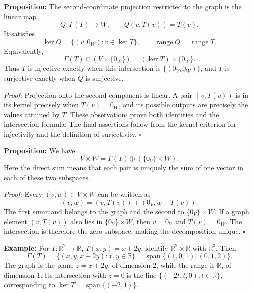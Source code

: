 \documentclass[a4paper,11pt,abstract=true]{scrartcl}
\theoremstyle{dotlessP}
\theoremstyle{dotlessS}
\theoremstyle{remark}
\theoremstyle{definition}
\begin{document}
\begin{problem_box}
\textbf{Proposition:} The
second-coordinate projection restricted to the graph is the linear map
\[
Q:\Gamma(T)\longrightarrow W,\qquad Q(v,T(v))=T(v).
\]
It satisfies
\[
\ker Q=\{(v,0_W):v\in\ker T\},\qquad
\operatorname{range}Q=\operatorname{range}T.
\]
Equivalently,
\[
\Gamma(T)\cap(V\times\{0_W\})=(\ker T)\times\{0_W\}.
\]
Thus $T$ is injective exactly when this intersection is
$\{(0_V,0_W)\}$, and $T$ is surjective exactly when $Q$ is surjective.

\end{problem_box}

\begin{claim_box}
\textit{Proof:} Projection onto the second component is linear.
A pair $(v,T(v))$ is in its kernel precisely when $T(v)=0_W$,
and its possible outputs are precisely the values attained by $T$.
These observations prove both identities and the intersection formula.
The final assertions follow from the kernel criterion for injectivity
and the definition of surjectivity. \hfill$\square$
\end{claim_box}

\begin{problem_box}
\textbf{Proposition:} We have
\[
V\times W=\Gamma(T)\oplus(\{0_V\}\times W).
\]
Here the direct sum means that each pair is uniquely the sum of one
vector in each of these two subspaces.

\end{problem_box}

\begin{claim_box}
\textit{Proof:} Every $(v,w)\in V\times W$ can be written as
\[
(v,w)=(v,T(v))+(0_V,w-T(v)).
\]
The first summand belongs to the graph and the second to
$\{0_V\}\times W$. If a graph element $(v,T(v))$ also lies in
$\{0_V\}\times W$, then $v=0_V$ and $T(v)=0_W$. The intersection
is therefore the zero subspace, making the decomposition unique.
\hfill$\square$
\end{claim_box}

\begin{example_box}
\textbf{Example:} For $T:\mathbb{R}^2\longrightarrow\mathbb{R}$,
$T(x,y)=x+2y$, identify $\mathbb{R}^2\times\mathbb{R}$ with
$\mathbb{R}^3$. Then
\[
\Gamma(T)=\{(x,y,x+2y):x,y\in\mathbb{R}\}
=\operatorname{span}\{(1,0,1),(0,1,2)\}.
\]
The graph is the plane $z=x+2y$, of dimension $2$, while the range is
$\mathbb{R}$, of dimension $1$. Its intersection with $z=0$ is the
line $\{(-2t,t,0):t\in\mathbb{R}\}$, corresponding to
$\ker T=\operatorname{span}\{(-2,1)\}$.
\end{example_box}
\end{document}
